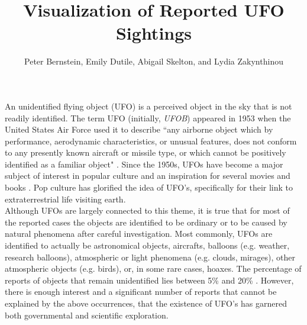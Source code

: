 \documentclass[journal]{vgtc}                %
\title{Visualization of Reported UFO Sightings}
\author{Peter Bernstein, Emily Dutile, Abigail Skelton, and Lydia Zakynthinou}
\begin{document}


\maketitle

An unidentified flying object (UFO) is a perceived object in the sky that is not readily identified. The term UFO (initially, \textit{UFOB}) appeared in 1953 when the United States Air Force used it to describe ``any airborne object which by performance, aerodynamic characteristics, or unusual features, does not conform to any presently known aircraft or missile type, or which cannot be positively identified as a familiar object" \cite{ufowiki}. Since the 1950s, UFOs have become a major subject of interest in popular culture and an inspiration for several movies and books \cite{history}. Pop culture has glorified the idea of UFO's, specifically for their link to extraterrestrial life visiting earth.\\
\indent Although UFOs are largely connected to this theme, it is true that for most of the reported cases the objects are identified to be ordinary or to be caused by natural phenomena after careful investigation. Most commonly, UFOs are identified to actually be astronomical objects, aircrafts, balloons (e.g. weather, research balloons), atmospheric or light phenomena (e.g. clouds, mirages), other atmospheric objects (e.g. birds), or, in some rare cases, hoaxes. The percentage of reports of objects that remain unidentified lies between 5\% and 20\%  \cite{ufowiki}. However, there is enough interest and a significant number of reports that cannot be explained by the above occurrences, that the existence of UFO's has garnered both governmental and scientific exploration.\\
\end{document}
